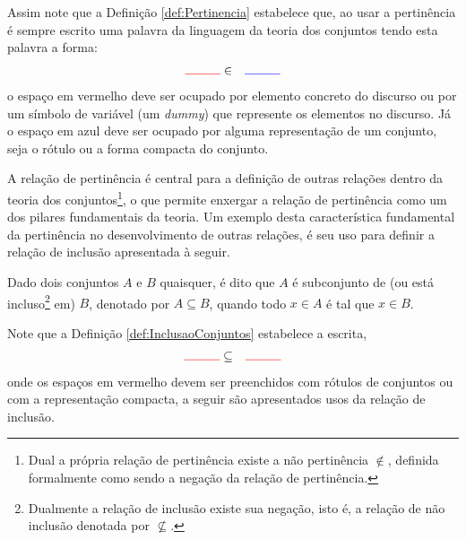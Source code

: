 Assim note que a Definição \ref{def:Pertinencia} estabelece que, ao usar a pertinência é sempre escrito uma palavra da linguagem da teoria dos conjuntos tendo esta palavra a forma:
\begin{eqnarray*}
  {\color{red}\rule{1cm}{0.4pt}} & \in & {\color{blue}\rule{1cm}{0.4pt}} 
\end{eqnarray*}
o espaço em {\color{red}vermelho} deve ser ocupado por elemento concreto do discurso ou por um símbolo de variável (um \textit{dummy}) que represente os elementos no discurso. Já o espaço em {\color{blue}azul} deve ser ocupado por alguma representação de um conjunto, seja o rótulo ou a forma compacta do conjunto.


A relação de pertinência é central para a definição de outras relações dentro da teoria dos conjuntos\footnote{Dual a própria relação de pertinência existe a não pertinência $\notin$, definida formalmente como sendo a negação da relação de pertinência.}, o que permite enxergar a relação de pertinência como um dos pilares fundamentais da teoria. Um exemplo desta característica fundamental da pertinência no desenvolvimento de outras relações, é seu uso para definir a relação de inclusão apresentada à seguir.

\begin{definicao}\label{def:InclusaoConjuntos}
  \cite{lipschutz1978-TC} Dado dois conjuntos $A$ e $B$ quaisquer, é dito que $A$ é subconjunto de (ou está incluso\footnote{Dualmente a relação de inclusão existe sua negação, isto é, a relação de não inclusão denotada por $\not\subseteq$.} em) $B$, denotado por $A \subseteq B$, quando todo $x \in A$ é tal que $x \in B$.
\end{definicao}

Note que a Definição \ref{def:InclusaoConjuntos} estabelece a escrita,
\begin{eqnarray*}
  {\color{red}\rule{1cm}{0.4pt}} & \subseteq & {\color{red}\rule{1cm}{0.4pt}} 
\end{eqnarray*}
onde os espaços em {\color{red}vermelho} devem ser preenchidos com rótulos de conjuntos ou com a representação compacta, a seguir são apresentados usos da relação de inclusão.

